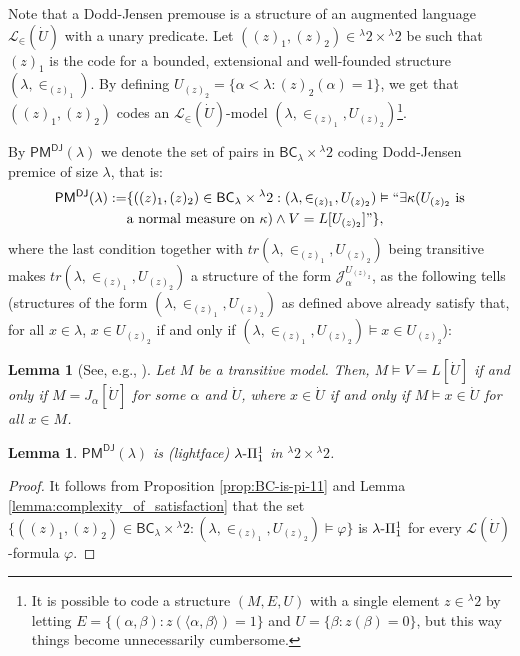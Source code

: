 \documentclass{amsart}
\numberwithin{equation}{section}
\def\hyp{{\hbox{-}}}
\newtheorem{lemma}[theorem]{Lemma}
\theoremstyle{definition}
\theoremstyle{remark}
\begin{document}
Note that a Dodd-Jensen premouse is a structure of an augmented language $\mathcal L_{\in}(\dot{U})$ with a unary predicate. Let $((z)_1,(z)_2)\in{}^{\lambda}2\times{}^{\lambda}2$ be such that $(z)_1$ is the code for a bounded, extensional and well-founded structure $(\lambda,\in_{(z)_1})$. By defining $U_{(z)_2}=\{\alpha<\lambda:(z)_2(\alpha)=1\}$, we get that $((z)_1,(z)_2)$ codes an $\mathcal{L}_{\in}(\dot{U})$-model $(\lambda,\in_{(z)_1},U_{(z)_2})$\footnote{It is possible to code a structure $(M,E,U)$ with a single element $z\in{}^{\lambda}2$ by letting $E=\{(\alpha,\beta):z(\langle \alpha,\beta\rangle)=1\}$ and $U=\{\beta:z(\beta)=0\}$, but this way things become unnecessarily cumbersome.}.

By $\mathsf{PM^{DJ}}(\lambda)$ we denote the set of pairs in $\mathsf{BC}_{\lambda}\times{}^{\lambda}2$ coding Dodd-Jensen premice of size $\lambda$, that is:
\begin{equation*}
	\begin{split}
		\mathsf{PM^{DJ}}(\lambda):=&\{((z)_1,(z)_2)\in \mathsf{BC}_{\lambda}\times{}^{\lambda}2:(\lambda,\in_{(z)_1},U_{(z)_2})\vDash``\exists\kappa(U_{(z)_2}\text{ is}\\&\text{a normal measure on } \kappa)\wedge V=L[U_{(z)_2}]"\},
	\end{split}
\end{equation*}
where the last condition together with $tr(\lambda,\in_{(z)_1},U_{(z)_2})$ being transitive makes $tr(\lambda,\in_{(z)_1},U_{(z)_2})$ a structure of the form $\mathcal{J}^{U_{(z)_2}}_{\alpha}$, as the following tells (structures of the form $(\lambda,\in_{(z)_1},U_{(z)_2})$ as defined above already satisfy that, for all $x\in\lambda$, $x\in U_{(z)_2}$ if and only if $(\lambda,\in_{(z)_1},U_{(z)_2})\vDash x\in U_{(z)_2}$):

\begin{lemma}[See, e.g., {\cite[Lemma 5.28]{schindler2014set}}]\label{l39} Let $M$ be a transitive model. Then, $M\vDash V=L[\dot{U}]$ if and only if $M=J_{\alpha}[\dot{U}]$ for some $\alpha$ and $\dot{U}$, where $x\in\dot{U}$ if and only if $M\vDash x\in\dot{U}$ for all $x\in M$. 
\end{lemma}

\begin{lemma}\label{SPM} $\mathsf{PM^{DJ}}(\lambda)$ is \emph{(lightface)} $\lambda\hyp\Pi^1_1$ in ${}^{\lambda}2\times{}^{\lambda}2$.
\end{lemma} 
\begin{proof} It follows from Proposition \ref{prop:BC-is-pi-11} and Lemma \ref{lemma:complexity_of_satisfaction} that the set $\{((z)_1,(z)_2)\in\mathsf{BC}_\lambda\times{}^{\lambda}2:(\lambda,\in_{(z)_1},U_{(z)_2})\vDash\varphi\}$
is $\lambda\hyp\Pi^1_1$ for every $\mathcal{L}(\dot{U})$-formula $\varphi$.
\end{proof}
\end{document}
